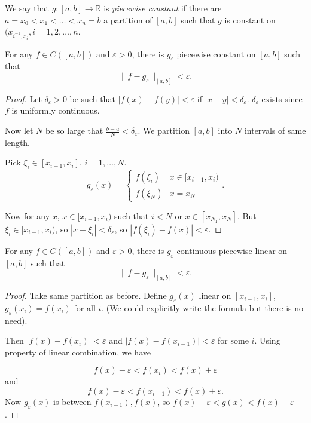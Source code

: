 
We say that $g: [a,b] \to \mathbb{R}$ is \textit{piecewise constant} if there are $a = x_0 < x_1 < \ldots < x_n = b$ a partition of $[a,b]$ such that $g $ is constant on $(x_{i^{-1} , x_i}, i = 1,2,\ldots,n$.

\begin{theorem}
	For any $f \in C([a,b])$ and $\varepsilon>0$, there is $g_\varepsilon$ piecewise constant on $[a,b]$ such that \[
		\|f - g_\varepsilon\|_{[a,b]} < \varepsilon
	.\] 
\end{theorem}
\begin{proof}
	Let $\delta_\varepsilon>0$ be such that $|f(x) - f(y)| < \varepsilon$ if $|x-y|<\delta_\varepsilon$. $\delta_\varepsilon$ exists since $f$ is uniformly continuous.

	Now let $N $ be so large that $\frac{b-a}{N}<\delta_\varepsilon$. We partition $[a,b]$ into $N$ intervals of same length.

	Pick $\xi_i \in [x_{i-1}, x_i]$, $i = 1,\ldots, N$. \[
		g_\varepsilon(x) = \begin{cases}
			f(\xi_i) & x \in [x_{i-1}, x_i)\\
			f(\xi_N) & x = x_N
		\end{cases}
	.\] 

	Now for any $x$, $x \in [x_{i-1}, x_i)$ such that $i < N$ or $x \in [x_{N_1}, x_N]$.
	But  $\xi_i \in [x_{i-1}, x_i)$, so $|x - \xi_i| < \delta_\varepsilon$, so $|f(\xi_i) - f(x)| < \varepsilon$.
\end{proof}

\begin{theorem}
	For any $f \in C([a,b])$ and $\varepsilon>0$, there is $g_\varepsilon$ continuous piecewise linear on $[a,b]$ such that \[
		\|f - g_\varepsilon\|_{[a,b]} < \varepsilon
	.\]
\end{theorem}
\begin{proof}
	Take same partition as before. Define
	$g_\varepsilon(x)$ linear on $[x_{i-1}, x_i]$, $g_\varepsilon(x_i) = f(x_i)$ for all $i$. (We could explicitly write the formula but there is no need).

	Then $|f(x) - f(x_i)| < \varepsilon$ and $|f(x) - f(x_{i-1})| < \varepsilon$ for some $i$. Using property of linear combination, we have

	\[
		f(x) - \varepsilon< f(x_i) < f(x) + \varepsilon
	\]  and \[
		f(x) - \varepsilon < f(x_{i-1}) < f(x) + \varepsilon
	.\] 
	Now $g_\varepsilon(x)$ is between $f(x_{i-1}), f(x)$, so $f(x) - \varepsilon < g(x) < f(x) + \varepsilon$.
\end{proof}

